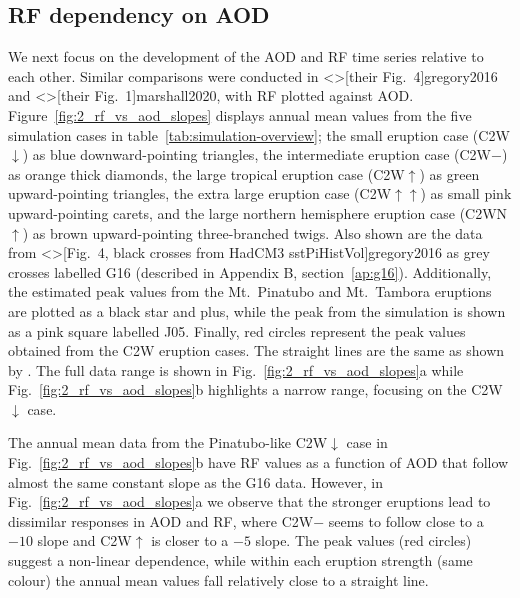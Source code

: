 \documentclass[draft]{agujournal2019}
\begin{document}
  \subsection{RF dependency on AOD}

  We next focus on the development of the AOD and RF time series relative to each other.
  Similar comparisons were conducted in \citeA<>[their Fig.\ 4]{gregory2016} and
  \citeA<>[their Fig.\ 1]{marshall2020}, with RF plotted against AOD.
  Figure~\ref{fig:2_rf_vs_aod_slopes} displays annual mean values from the five
  simulation cases in table~\ref{tab:simulation-overview}; the small eruption case
  (C2W\(\downarrow\)) as blue downward-pointing triangles, the intermediate eruption
  case (C2W\(-\)) as orange thick diamonds, the large tropical eruption case
  (C2W\(\uparrow\)) as green upward-pointing triangles, the extra large eruption case
  (C2W\(\uparrow\uparrow\)) as small pink upward-pointing carets, and the large northern
  hemisphere eruption case (C2WN\(\uparrow\)) as brown upward-pointing three-branched
  twigs. Also shown are the data from \citeA<>[Fig.\ 4, black crosses from HadCM3
    sstPiHistVol]{gregory2016} as grey crosses labelled G16 (described in Appendix B,
  section~\ref{ap:g16}). Additionally, the estimated peak values from the Mt.\ Pinatubo
  and Mt.\ Tambora eruptions are plotted as a black star and plus, while the peak from
  the  simulation is shown as a pink square labelled J05. Finally, red
  circles represent the peak values obtained from the C2W eruption cases. The straight
  lines are the same as shown by . The full data range is shown in
  Fig.~\ref{fig:2_rf_vs_aod_slopes}a while Fig.~\ref{fig:2_rf_vs_aod_slopes}b highlights
  a narrow range, focusing on the C2W\(\downarrow\) case.

  The annual mean data from the Pinatubo-like C2W\(\downarrow\) case in
  Fig.~\ref{fig:2_rf_vs_aod_slopes}b have RF values as a function of AOD that follow
  almost the same constant slope as the G16 data. However, in
  Fig.~\ref{fig:2_rf_vs_aod_slopes}a we observe that the stronger eruptions lead to
  dissimilar responses in AOD and RF, where C2W\(-\) seems to follow close to a \(-10\)
  slope and C2W\(\uparrow\) is closer to a \(-5\) slope. The peak values (red circles)
  suggest a non-linear dependence, while within each eruption strength (same colour) the
  annual mean values fall relatively close to a straight line.
\end{document}
